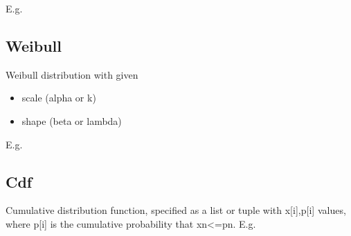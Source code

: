 \documentclass[letterpaper,10pt,english]{sphinxmanual}
\begin{document}
E.g.

%
\begin{sphinxVerbatim}[commandchars=\\\{\}]
   
\end{sphinxVerbatim}


\subsection{Weibull}
\label{\detokenize{Distributions:weibull}}
Weibull distribution with given
\begin{itemize}
\item {} 
scale (alpha or k)

\item {} 
shape (beta or lambda)

\end{itemize}

E.g.

%
\begin{sphinxVerbatim}[commandchars=\\\{\}]
     
\end{sphinxVerbatim}


\subsection{Cdf}
\label{\detokenize{Distributions:cdf}}
Cumulative distribution function, specified as a list or tuple with x{[}i{]},p{[}i{]} values, where p{[}i{]} is the cumulative probability
that xn\textless{}=pn. E.g.

%
\begin{sphinxVerbatim}[commandchars=\\\{\}]
           
\end{sphinxVerbatim}
\end{document}
